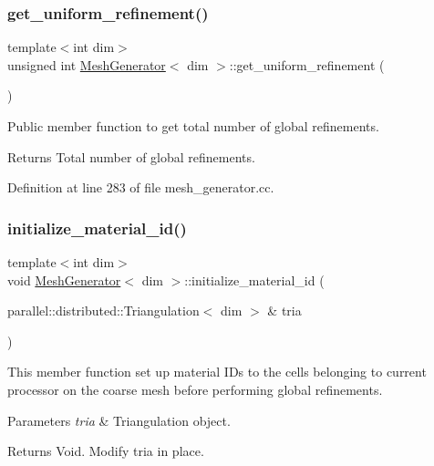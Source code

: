 \subsubsection{\texorpdfstring{get\+\_\+uniform\+\_\+refinement()}{get\_uniform\_refinement()}}
{\footnotesize\ttfamily template$<$int dim$>$ \\
unsigned int \hyperlink{class_mesh_generator}{Mesh\+Generator}$<$ dim $>$\+::get\+\_\+uniform\+\_\+refinement (\begin{DoxyParamCaption}{ }\end{DoxyParamCaption})}

Public member function to get total number of global refinements.

\begin{DoxyReturn}{Returns}
Total number of global refinements. 
\end{DoxyReturn}


Definition at line 283 of file mesh\+\_\+generator.\+cc.

\mbox{\label{class_mesh_generator_a8c0f48b88435360f1209251253912411}} 
\subsubsection{\texorpdfstring{initialize\+\_\+material\+\_\+id()}{initialize\_material\_id()}}
{\footnotesize\ttfamily template$<$int dim$>$ \\
void \hyperlink{class_mesh_generator}{Mesh\+Generator}$<$ dim $>$\+::initialize\+\_\+material\+\_\+id (\begin{DoxyParamCaption}\item[{parallel\+::distributed\+::\+Triangulation$<$ dim $>$ \&}]{tria }\end{DoxyParamCaption})\hspace{0.3cm}{\ttfamily [private]}}

This member function set up material I\+Ds to the cells belonging to current processor on the coarse mesh before performing global refinements.


\begin{DoxyParams}{Parameters}
{\em tria} & Triangulation object. \\
\hline
\end{DoxyParams}
\begin{DoxyReturn}{Returns}
Void. Modify tria in place. 
\end{DoxyReturn}


